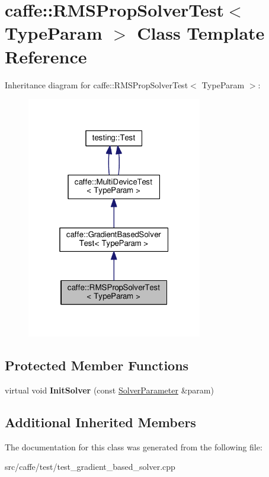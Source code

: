 \hypertarget{classcaffe_1_1_r_m_s_prop_solver_test}{}\section{caffe\+:\+:R\+M\+S\+Prop\+Solver\+Test$<$ Type\+Param $>$ Class Template Reference}
\label{classcaffe_1_1_r_m_s_prop_solver_test}


Inheritance diagram for caffe\+:\+:R\+M\+S\+Prop\+Solver\+Test$<$ Type\+Param $>$\+:
\nopagebreak
\begin{figure}[H]
\begin{center}
\leavevmode
\includegraphics[width=217pt]{classcaffe_1_1_r_m_s_prop_solver_test__inherit__graph}
\end{center}
\end{figure}
\subsection*{Protected Member Functions}
\begin{DoxyCompactItemize}
\item 
\mbox{\label{classcaffe_1_1_r_m_s_prop_solver_test_aec52fed19a5c9965092aabb7cef8c5fd}} 
virtual void {\bfseries Init\+Solver} (const \mbox{\hyperlink{classcaffe_1_1_solver_parameter}{Solver\+Parameter}} \&param)
\end{DoxyCompactItemize}
\subsection*{Additional Inherited Members}


The documentation for this class was generated from the following file\+:\begin{DoxyCompactItemize}
\item 
src/caffe/test/test\+\_\+gradient\+\_\+based\+\_\+solver.\+cpp\end{DoxyCompactItemize}
